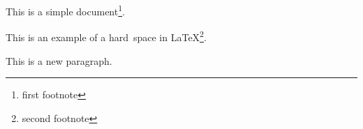 \documentclass[a4paper,12pt]{article} %
\begin{document}
This is   a simple
document\footnote{first footnote}.

This is an example of a hard~space in LaTeX\footnote{second footnote}.

This is a new paragraph.
\end{document}

